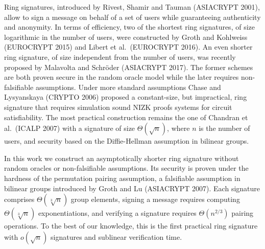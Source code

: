 
Ring signatures, introduced by Rivest, Shamir and Tauman (ASIACRYPT 2001), allow to sign a message on behalf of a set of users while guaranteeing authenticity and anonymity. In terms of efficiency, two of the shortest ring signatures,  of size logarithmic in the number of users, were constructed by Groth and Kohlweiss (EUROCRYPT 2015) and Libert et al.~(EUROCRYPT 2016). An even shorter ring signature, of size independent from the number of users, was recently proposed by Malavolta and  Schr\"oder (ASIACRYPT 2017).
The former schemes are both proven secure in the random oracle model while the later requires non-falsifiable assumptions.
Under more standard assumptions Chase and Lysyanskaya (CRYPTO 2006) proposed a constant-size, but impractical, ring signature that requires simulation sound NIZK proofs systems for circuit satisfiability.
The most practical construction remains the one of Chandran et al.~(ICALP 2007) with a signature of size $\Theta(\sqrt{n})$, where $n$ is the number of users, and security based on the Diffie-Hellman assumption in bilinear groups.

In this work we construct an asymptotically shorter ring signature without random oracles or non-falsifiable assumptions. Its security is proven under the hardness of the permutation pairing assumption, a falsifiable assumption in bilinear groups introduced by Groth and Lu (ASIACRYPT 2007).
 Each signature comprises $\Theta(\sqrt[3]{n})$ group elements, signing a message requires computing $\Theta(\sqrt[3]{n})$ exponentiations, and verifying a signature requires $\Theta(n^{2/3})$ pairing operations. To the best of our knowledge, this is the first practical ring signature with $o(\sqrt{n})$ signatures and sublinear verification time.
